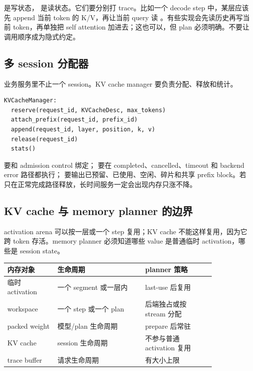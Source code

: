  是写状态， 是读状态。它们要分别打 trace。比如一个 decode step 中，某层应该先 append 当前 token 的 K/V，再让当前 query 读 。有些实现会先读历史再写当前 token，再单独把 self attention 加进去；这也可以，但 plan 必须明确。不要让调用顺序成为隐式约定。

\subsection{多 session 分配器}

业务服务里不止一个 session。KV cache manager 要负责分配、释放和统计。

\begin{lstlisting}[numbers=none,caption={KVCacheManager 职责}]
KVCacheManager:
  reserve(request_id, KVCacheDesc, max_tokens)
  attach_prefix(request_id, prefix_id)
  append(request_id, layer, position, k, v)
  release(request_id)
  stats()
\end{lstlisting}

 要和 admission control 绑定； 要在 completed、cancelled、timeout 和 backend error 路径都执行； 要输出已预留、已使用、空闲、碎片和共享 prefix block。若只在正常完成路径释放，长时间服务一定会出现内存只涨不降。

\subsection{KV cache 与 memory planner 的边界}

activation arena 可以按一层或一个 step 复用；KV cache 不能这样复用，因为它跨 token 存活。memory planner 必须知道哪些 value 是普通临时 activation，哪些是 session state。

\begin{center}
\begin{tabular}{p{0.20\linewidth}p{0.35\linewidth}p{0.29\linewidth}}
\toprule
内存对象 & 生命周期 & planner 策略 \\
\midrule
临时 activation & 一个 segment 或一层内 & last-use 后复用 \\
workspace & 一个 step 或一个 plan & 后端独占或按 stream 分配 \\
packed weight & 模型/plan 生命周期 & prepare 后常驻 \\
KV cache & session 生命周期 & 不参与普通 activation 复用 \\
trace buffer & 请求生命周期 & 有大小上限 \\
\bottomrule
\end{tabular}
\end{center}

